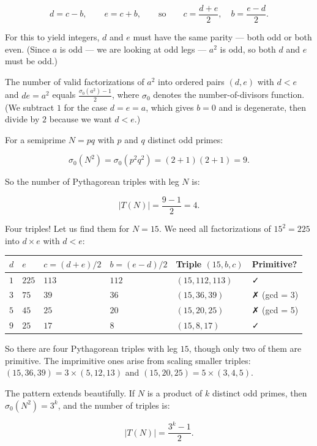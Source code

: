\[d = c - b, \qquad e = c + b, \qquad \text{so} \qquad c = \frac{d + e}{2}, \quad b = \frac{e - d}{2}.\]

For this to yield integers, $d$ and $e$ must have the same parity --- both odd or both even. (Since $a$ is odd --- we are looking at odd legs --- $a^2$ is odd, so both $d$ and $e$ must be odd.)

The number of valid factorizations of $a^2$ into ordered pairs $(d, e)$ with $d < e$ and $de = a^2$ equals $\frac{\sigma_0(a^2) - 1}{2}$, where $\sigma_0$ denotes the number-of-divisors function. (We subtract $1$ for the case $d = e = a$, which gives $b = 0$ and is degenerate, then divide by $2$ because we want $d < e$.)

For a semiprime $N = pq$ with $p$ and $q$ distinct odd primes:

\[\sigma_0(N^2) = \sigma_0(p^2 q^2) = (2 + 1)(2 + 1) = 9.\]

So the number of Pythagorean triples with leg $N$ is:

\[|T(N)| = \frac{9 - 1}{2} = 4.\]

Four triples! Let us find them for $N = 15$. We need all factorizations of $15^2 = 225$ into $d \times e$ with $d < e$:


\begin{center}
\begin{tabular}{llllll}
\toprule
$d$ & $e$ & $c = (d+e)/2$ & $b = (e-d)/2$ & Triple $(15, b, c)$ & Primitive? \\
\midrule
$1$ & $225$ & $113$ & $112$ & $(15, 112, 113)$ & ✓ \\
$3$ & $75$ & $39$ & $36$ & $(15, 36, 39)$ & ✗ (gcd = 3) \\\index{greatest common divisor}
$5$ & $45$ & $25$ & $20$ & $(15, 20, 25)$ & ✗ (gcd = 5) \\
$9$ & $25$ & $17$ & $8$ & $(15, 8, 17)$ & ✓ \\
\bottomrule
\end{tabular}
\end{center}


So there are four Pythagorean triples with leg $15$, though only two of them are primitive. The imprimitive ones arise from scaling smaller triples: $(15, 36, 39) = 3 \times (5, 12, 13)$ and $(15, 20, 25) = 5 \times (3, 4, 5)$.


The pattern extends beautifully. If $N$ is a product of $k$ distinct odd primes, then $\sigma_0(N^2) = 3^k$, and the number of triples is:

\[|T(N)| = \frac{3^k - 1}{2}.\]


